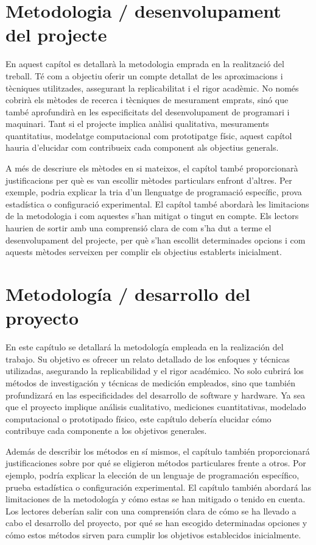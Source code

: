 
\ifcase\doclanguage
\or
  \chapter{Metodologia / desenvolupament del projecte}
  
  En aquest capítol es detallarà la metodologia emprada en la realització del treball. Té com a objectiu oferir un compte detallat de les aproximacions i tècniques utilitzades, assegurant la replicabilitat i el rigor acadèmic. No només cobrirà els mètodes de recerca i tècniques de mesurament emprats, sinó que també aprofundirà en les especificitats del desenvolupament de programari i maquinari. Tant si el projecte implica anàlisi qualitativa, mesuraments quantitatius, modelatge computacional com prototipatge físic, aquest capítol hauria d'elucidar com contribueix cada component als objectius generals.
  
  A més de descriure els mètodes en si mateixos, el capítol també proporcionarà justificacions per què es van escollir mètodes particulars enfront d'altres. Per exemple, podria explicar la tria d'un llenguatge de programació específic, prova estadística o configuració experimental. El capítol també abordarà les limitacions de la metodologia i com aquestes s'han mitigat o tingut en compte. Els lectors haurien de sortir amb una comprensió clara de com s'ha dut a terme el desenvolupament del projecte, per què s'han escollit determinades opcions i com aquests mètodes serveixen per complir els objectius establerts inicialment.
  
\or
  \chapter{Metodología / desarrollo del proyecto}
  En este capítulo se detallará la metodología empleada en la realización del trabajo. Su objetivo es ofrecer un relato detallado de los enfoques y técnicas utilizadas, asegurando la replicabilidad y el rigor académico. No solo cubrirá los métodos de investigación y técnicas de medición empleados, sino que también profundizará en las especificidades del desarrollo de software y hardware. Ya sea que el proyecto implique análisis cualitativo, mediciones cuantitativas, modelado computacional o prototipado físico, este capítulo debería elucidar cómo contribuye cada componente a los objetivos generales.
  
  Además de describir los métodos en sí mismos, el capítulo también proporcionará justificaciones sobre por qué se eligieron métodos particulares frente a otros. Por ejemplo, podría explicar la elección de un lenguaje de programación específico, prueba estadística o configuración experimental. El capítulo también abordará las limitaciones de la metodología y cómo estas se han mitigado o tenido en cuenta. Los lectores deberían salir con una comprensión clara de cómo se ha llevado a cabo el desarrollo del proyecto, por qué se han escogido determinadas opciones y cómo estos métodos sirven para cumplir los objetivos establecidos inicialmente.
  
